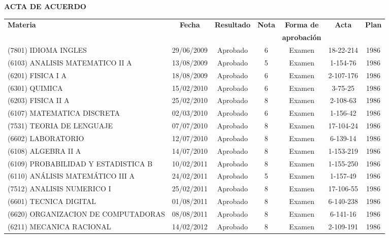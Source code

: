 \hspace*{\fill}\textbf{ACTA DE ACUERDO}\hspace*{\fill}


\begin{table}[htb]
  \scriptsize
  \centering
  \begin{tabular}{p{4cm} *{6}{c}}
  \toprule
  \textbf{Materia} & \textbf{Fecha} & \textbf{Resultado} & \textbf{Nota} & \textbf{Forma de} & \textbf{Acta} & \textbf{Plan} \tabularnewline
   & & & & \textbf{aprobación} & & \tabularnewline
  \midrule
  
    (7801) IDIOMA INGLES & 29/06/2009 & Aprobado & 6 & Examen & 18-22-214 & 1986 \tabularnewline

    (6103) ANALISIS MATEMATICO II A & 13/08/2009 & Aprobado & 5 & Examen & 1-154-76 & 1986 \tabularnewline

    (6201) FISICA I A & 18/08/2009 & Aprobado & 6 & Examen & 2-107-176 & 1986 \tabularnewline

    (6301) QUIMICA & 15/02/2010 & Aprobado & 6 & Examen & 3-75-25 & 1986 \tabularnewline

    (6203) FISICA II A & 25/02/2010 & Aprobado & 8 & Examen & 2-108-63 & 1986 \tabularnewline

    (6107) MATEMATICA DISCRETA & 02/03/2010 & Aprobado & 6 & Examen & 1-156-42 & 1986 \tabularnewline

    (7531) TEORIA DE LENGUAJE & 07/07/2010 & Aprobado & 8 & Examen & 17-104-24 & 1986 \tabularnewline

    (6602) LABORATORIO & 12/07/2010 & Aprobado & 8 & Examen & 6-139-14 & 1986 \tabularnewline

    (6108) ALGEBRA II A & 14/07/2010 & Aprobado & 8 & Examen & 1-153-219 & 1986 \tabularnewline

    (6109) PROBABILIDAD Y ESTADISTICA B & 10/02/2011 & Aprobado & 8 & Examen & 1-155-250 & 1986 \tabularnewline

    (6110) ANÁLISIS MATEMÁTICO III A & 24/02/2011 & Aprobado & 5 & Examen & 1-157-49 & 1986 \tabularnewline

    (7512) ANALISIS NUMERICO I & 25/02/2011 & Aprobado & 8 & Examen & 17-106-55 & 1986 \tabularnewline

    (6601) TECNICA DIGITAL & 01/08/2011 & Aprobado & 8 & Examen & 6-140-238 & 1986 \tabularnewline

    (6620) ORGANIZACION DE COMPUTADORAS & 08/08/2011 & Aprobado & 8 & Examen & 6-141-16 & 1986 \tabularnewline

    (6211) MECANICA RACIONAL & 14/02/2012 & Aprobado & 8 & Examen & 2-109-191 & 1986 \tabularnewline


\end{tabular}
\end{table}

